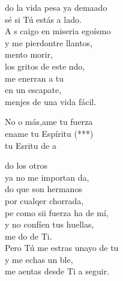 \begin{cancion}%
	do la vida pesa ya demaado\\
	 sé si Tú estás a  lado.\\
	A s caigo en  miseria egoísmo\\
	y me pierdontre llantos, \\
	mento morir,\\
	los gritos de este ndo,\\
	me enerran a tu  \\
	en un escapate, \\
	menjes de una vida fácil.\jump\\
	\begin{chorus}%
		No o más,ame tu fuerza\\
		ename tu Espíritu (***)\\
		tu Esritu de a\jump\\
	\end{chorus}%
	do los otros\\
	ya no me importan da,\\
	do que son hermanos \\
	por cualqer chorrada,\\
	pe como sii fuerza ha de mí,\\
	y no confíen tus huellas, \\
	me do de Ti.\\
	Pero Tú me estras unayo de tu \\
	y me echas un ble, \\
	me aentas desde Ti a seguir.\\
\end{cancion}%

